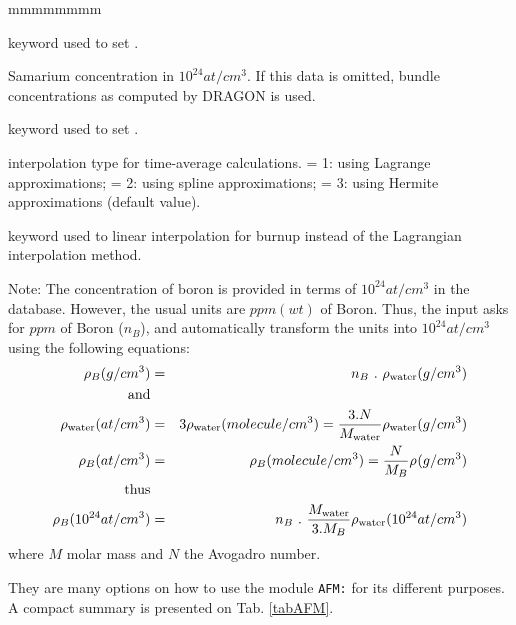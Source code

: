 \begin{ListeDeDescription}{mmmmmmmm}
\item[\moc{SAM}] keyword used to set .

\item[\dusa{nSm}] Samarium concentration in $10^{24} at/cm^3$. 
If this data is omitted, bundle concentrations as computed by DRAGON is used.

\item[\moc{IMET}] keyword used to set .

\item[\dusa{imet}] interpolation type for time-average calculations.
 = 1: using Lagrange approximations;  = 2: using 
spline approximations;  = 3: using Hermite approximations
(default value).

\item[\moc{BLIN}] keyword used to linear interpolation for burnup instead of the Lagrangian
interpolation method.

\end{ListeDeDescription}

\vskip 0.2cm

Note: The concentration of boron is provided in terms of $10^{24}at/cm^3$ in the database. However, the usual units are $ppm (wt)$ of Boron. Thus, the input asks for $ppm$ of Boron ($n_B$), and automatically transform the units into $10^{24}at/cm^3$ using the following equations:
\begin{eqnarray*}
\rho_B(g/cm^3) & = & n_B \ . \ \rho_{\rm water}(g/cm^3)\\
 {\rm and} & & \\
 \rho_{\rm water}(at/cm^3) & = & 3 \rho_{\rm water}(molecule/cm^3) =\frac{3.N}{M_{\rm water}} \rho_{\rm water}(g/cm^3)\\
 \rho_{B}(at/cm^3) & = & \rho_{B}(molecule/cm^3) =\frac{N}{M_{B}} \rho_{}(g/cm^3)\\
 {\rm thus} & & \\
 \rho_{B}(10^{24}at/cm^3) & = &  n_B \ . \ \frac{M_{\rm water}}{3.M_{B}} \rho_{\rm water}(10^{24}at/cm^3) 
\end{eqnarray*}
where $M$ molar mass and $N$ the Avogadro number.

They are many options on how to use the module {\tt AFM:} for its different purposes. A compact summary is presented on Tab. \ref{tabAFM}.

